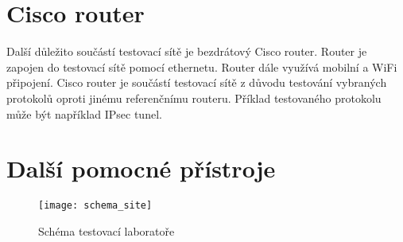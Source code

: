 \section{Cisco router}
Další důležito součástí testovací sítě je bezdrátový Cisco router. Router je zapojen do testovací sítě pomocí ethernetu. Router dále využívá mobilní a WiFi připojení. Cisco router je součástí testovací sítě z důvodu testování vybraných protokolů oproti jinému referenčnímu routeru. Příklad testovaného protokolu může být například IPsec tunel.

\section{Další pomocné přístroje}

\begin{figure}[h]
  \centering
  \texttt{[image: schema\_site]}
  \caption{Schéma testovací laboratoře}
  \label{fig:schema_site}
\end{figure}

\endinput
